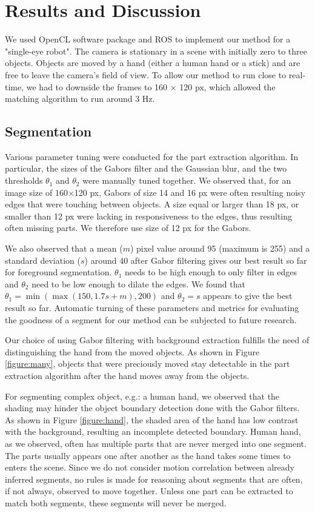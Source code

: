 \documentclass{article}
\begin{document}
\section{Results and Discussion}\label{sec:exp}

We used OpenCL software package and ROS to implement our method for a "single-eye robot". The camera is stationary in a scene with initially zero to three objects. Objects are moved by a hand (either a human hand or a stick) and are free to leave the camera's field of view. To allow our method to run close to real-time, we had to downside the frames to 160 $\times$ 120 px, which allowed the matching algorithm to run around 3 Hz. 

\subsection{Segmentation}

Various parameter tuning were conducted for the part extraction algorithm. In particular, the sizes of the Gabors filter and the Gaussian blur, and the two thresholds $\theta_1$ and $\theta_2$ were manually tuned together. We observed that, for an image size of 160$\times$120 px, Gabors of size 14 and 16 px were often resulting noisy edges that were touching between objects. A size equal or larger than 18 px, or smaller than 12 px were lacking in responsiveness to the edges, thus resulting often missing parts. We therefore use size of 12 px for the Gabors.

We also observed that a mean ($m$) pixel value around 95 (maximum is 255) and a standard deviation ($s$) around 40 after Gabor filtering gives our best result so far for foreground segmentation. $\theta_1$ needs to be high enough to only filter in edges and $\theta_2$ need to be low enough to dilate the edges. We found that $\theta_1 = \min(\max(150, 1.7s+m), 200)$ and $\theta_2 = s$ appears to give the best result so far. Automatic turning of these parameters and metrics for evaluating the goodness of a segment for our method can be subjected to future research.

Our choice of using Gabor filtering with background extraction fulfills the need of distinguishing the hand from the moved objects. As shown in Figure \ref{figure:many}, objects that were preciously moved stay detectable in the part extraction algorithm after the hand moves away from the objects. 

For segmenting complex object, e.g.: a human hand, we observed that the shading may hinder the object boundary detection done with the Gabor filters. As shown in Figure \ref{figure:hand}, the shaded area of the hand has low contrast with the background, resulting an incomplete detected boundary. Human hand, as we observed, often has multiple parts that are never merged into one segment. The parts usually appears one after another as the hand takes some times to enters the scene. Since we do not consider motion correlation between already inferred segments, no rules is made for reasoning about segments that are often, if not always, observed to move together. Unless one part can be extracted to match both segments, these segments will never be merged. 
\end{document}
